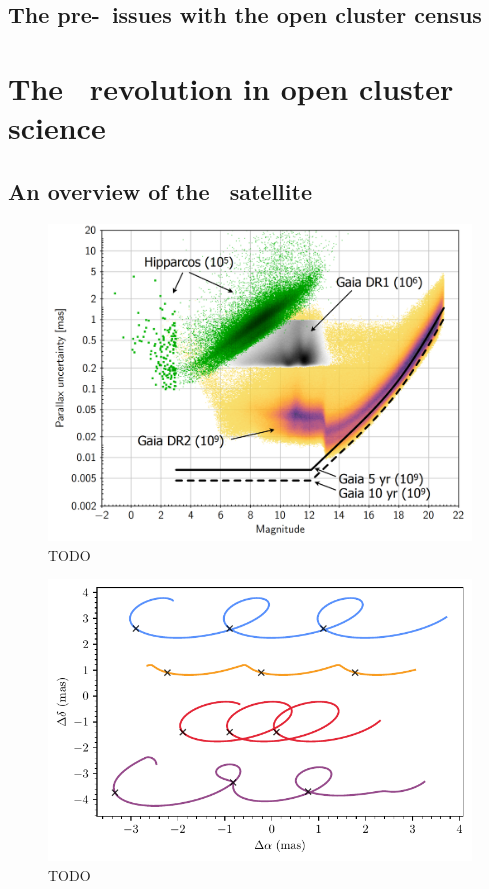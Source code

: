 \subsection{The pre-\gaia\ issues with the open cluster census}
\label{sec:intro:history:issues}






\section{The \gaia\ revolution in open cluster science}
\label{sec:intro:gaia}

\subsection{An overview of the \gaia\ satellite}
\label{sec:intro:gaia:overview}

\begin{figure}[tb]
	\includegraphics[width=\textwidth]{fig/c1/gaia_dr2_astrometry.png}
	\caption[TODO]{TODO}
	\label{fig:intro:gaia:accuracy}
\end{figure}

\begin{figure}[tb]
	\includegraphics[width=\textwidth]{fig/c1/tracks.pdf}
	\caption[TODO]{TODO}
	\label{fig:intro:gaia:tracks}
\end{figure}

